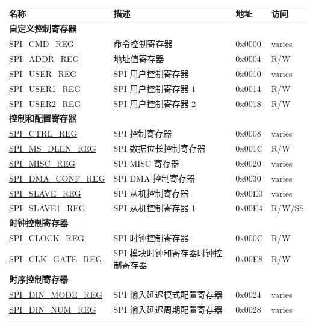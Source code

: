 \begin{longtable}{ | p{5.0cm} | p{7.2cm} | p{1.3cm} | p{2.0cm} | }
\hline\rowcolor{lightgray}
\textbf{名称} & \textbf{描述} &  \textbf{地址} & \textbf{访问} \\ \hline
\endhead
\multicolumn{4}{|l|}{\textbf{自定义控制寄存器}} \\ \hline
\hyperref[regdesc:SPICMDREG]{SPI\_CMD\_REG} & 命令控制寄存器 & 0x0000 & varies \\ \hline
\hyperref[regdesc:SPIADDRREG]{SPI\_ADDR\_REG} & 地址值寄存器 & 0x0004 & R/W \\ \hline
\hyperref[regdesc:SPIUSERREG]{SPI\_USER\_REG} & SPI 用户控制寄存器 & 0x0010 & varies \\ \hline
\hyperref[regdesc:SPIUSER1REG]{SPI\_USER1\_REG} & SPI 用户控制寄存器 1 & 0x0014 & R/W \\ \hline
\hyperref[regdesc:SPIUSER2REG]{SPI\_USER2\_REG} & SPI 用户控制寄存器 2 & 0x0018 & R/W \\ \hline
\multicolumn{4}{|l|}{\textbf{控制和配置寄存器}} \\ \hline
\hyperref[regdesc:SPICTRLREG]{SPI\_CTRL\_REG} & SPI  控制寄存器 & 0x0008 & varies \\ \hline
\hyperref[regdesc:SPIMSDLENREG]{SPI\_MS\_DLEN\_REG} & SPI 数据位长控制寄存器 & 0x001C & R/W \\ \hline
\hyperref[regdesc:SPIMISCREG]{SPI\_MISC\_REG} & SPI MISC 寄存器 & 0x0020 & varies \\ \hline
\hyperref[regdesc:SPIDMACONFREG]{SPI\_DMA\_CONF\_REG} & SPI DMA 控制寄存器 & 0x0030 & varies \\ \hline
\hyperref[regdesc:SPISLAVEREG]{SPI\_SLAVE\_REG} & SPI 从机控制寄存器 & 0x00E0 & varies \\ \hline
\hyperref[regdesc:SPISLAVE1REG]{SPI\_SLAVE1\_REG} & SPI 从机控制寄存器 1 & 0x00E4 & R/W/SS \\ \hline
\multicolumn{4}{|l|}{\textbf{时钟控制寄存器}} \\ \hline
\hyperref[regdesc:SPICLOCKREG]{SPI\_CLOCK\_REG} & SPI 时钟控制寄存器 & 0x000C & R/W \\ \hline
\hyperref[regdesc:SPICLKGATEREG]{SPI\_CLK\_GATE\_REG} & SPI 模块时钟和寄存器时钟控制寄存器 & 0x00E8 & R/W \\ \hline
\multicolumn{4}{|l|}{\textbf{时序控制寄存器}} \\ \hline
\hyperref[regdesc:SPIDINMODEREG]{SPI\_DIN\_MODE\_REG} & SPI 输入延迟模式配置寄存器 & 0x0024 & varies \\ \hline
\hyperref[regdesc:SPIDINNUMREG]{SPI\_DIN\_NUM\_REG} & SPI 输入延迟周期配置寄存器 & 0x0028 & varies \\ \hline

\end{longtable}
